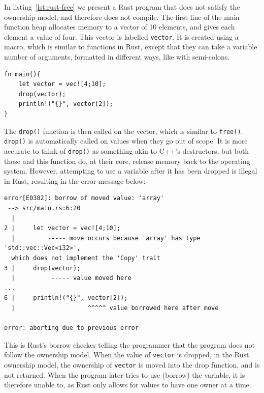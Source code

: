 In listing~\ref{lst:rust-free} we present a Rust program that does not satisfy the ownership model, and therefore does not compile. The first line of the main function heap allocates memory to a vector of 10 elements, and gives each element a value of four. This vector is labelled \texttt{vector}. It is created using a macro, which is similar to functions in Rust, except that they can take a variable number of arguments, formatted in different ways, like with semi-colons.

\begin{code}
\begin{verbatim}
fn main(){
    let vector = vec![4;10];
    drop(vector);
    println!("{}", vector[2]);
}
\end{verbatim}
\label{lst:rust-free}
\end{code}

The \texttt{drop()} function is then called on the vector, which is similar to \texttt{free()}. \texttt{drop()} is automatically called on values when they go out of scope. It is more accurate to think of \texttt{drop()} as something akin to C++'s destructors, but both those and this function do, at their core, release memory back to the operating system. However, attempting to use a variable after it has been dropped is illegal in Rust, resulting in the error message below:

\begin{code}
\begin{verbatim}
error[E0382]: borrow of moved value: 'array'
 --> src/main.rs:6:20
  |
2 |     let vector = vec![4;10];
  |         ----- move occurs because 'array' has type 'std::vec::Vec<i32>',
  which does not implement the 'Copy' trait
3 |     drop(vector);
  |          ----- value moved here
...
6 |     println!("{}", vector[2]);
  |                    ^^^^^ value borrowed here after move

error: aborting due to previous error
\end{verbatim}
\label{lst:rust-borrow-move}
\end{code}

This is Rust's borrow checker telling the programmer that the program does not follow the ownership model. When the value of \texttt{vector} is dropped, in the Rust ownership model, the ownership of \texttt{vector} is moved into the drop function, and is not returned.
When the program later tries to use (borrow) the variable, it is therefore unable to, as Rust only allows for values to have one owner at a time.


